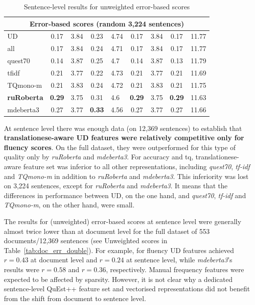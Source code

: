 \begin{table}[H]
\begin{tabular}{l|cl|cl|cl|cl}
		\multicolumn{9}{c}{Error-based scores (random 3,224 sentences)} \\
		\midrule
		UD              & 0.17 & 3.84 & 0.23 & 4.74 & 0.17 & 3.84 & 0.17 & 11.77 \\
		all             & 0.17 & 3.84 & 0.24 & 4.71 & 0.17 & 3.84 & 0.17 & 11.77 \\
		quest70         & 0.14 & 3.87 & 0.25 & 4.7  & 0.14 & 3.87 & 0.13 & 11.79 \\
		\midrule
		tfidf           & 0.21 & 3.77 & 0.22 & 4.73 & 0.21 & 3.77 & 0.21 & 11.69 \\
		\midrule
		TQmono-m        & 0.21 & 3.83 & 0.24 & 4.72 & 0.21 & 3.83 & 0.21 & 11.75 \\
		\textbf{ruRoberta} & \textbf{0.29} & 3.75 & 0.31 & 4.6  & \textbf{0.29} & 3.75 & \textbf{0.29} & 11.63 \\
		mdeberta3  & 0.27 & 3.77 & \textbf{0.33} & 4.56 & 0.27 & 3.77 & 0.27 & 11.66 \\
		\bottomrule
	\end{tabular}
	\caption{\label{tab:sent_err_double}Sentence-level results for unweighted error-based scores}
\end{table}

At sentence level there was enough data (on 12,369 sentences) to establish that \textbf{translationese-aware UD features were relatively competitive only for fluency scores}. On the full dataset, they were outperformed for this type of quality only by \textit{ruRoberta} and \textit{mdeberta3}. For accuracy and tq, translationese-aware feature set was inferior to all other representations, including \textit{quest70}, \textit{tf-idf} and \textit{TQmono-m} in addition to \textit{ruRoberta} and \textit{mdeberta3}. This inferiority was lost on 3,224 sentences, except for \textit{ruRoberta} and \textit{mdeberta3}. It means that the differences in performance between UD, on the one hand, and \textit{quest70}, \textit{tf-idf} and \textit{TQmono-m}, on the other hand, were small. 

\label{pg:downward_slide}
The results for (unweighted) error-based scores at sentence level were generally almost twice lower than at document level for the full dataset of 553 documents/12,369 sentences (see Unweighted scores in Table~\ref{tab:doc_err_double}). For example, for fluency UD features achieved $r=0.43$ at document level and $r=0.24$ at sentence level, while \textit{mdeberta3}'s results were $r=0.58$ and $r=0.36$, respectively. Manual frequency features were expected to be affected by sparsity. However, it is not clear why a dedicated sentence-level QuEst++ feature set and vectorised representations did not benefit from the shift from document to sentence level.

